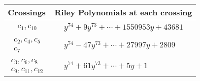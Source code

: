 \documentclass[1p]{elsarticle_modified}
\theoremstyle{definition}
\begin{document}
\begin{tabular}{m{50pt}|m{274pt}}
Crossings & \hspace{64pt}Riley Polynomials at each crossing \\
\hline $$\begin{aligned}c_{1},c_{10}\end{aligned}$$&$\begin{aligned}
&y^{74}+9 y^{73}+\cdots+1550953 y+43681
\end{aligned}$\\
\hline $$\begin{aligned}c_{2},c_{4},c_{5}\\c_{7}\end{aligned}$$&$\begin{aligned}
&y^{74}-47 y^{73}+\cdots+27997 y+2809
\end{aligned}$\\
\hline $$\begin{aligned}c_{3},c_{6},c_{8}\\c_{9},c_{11},c_{12}\end{aligned}$$&$\begin{aligned}
&y^{74}+61 y^{73}+\cdots+5 y+1
\end{aligned}$\\
\hline
\end{tabular}
\vskip 2pc
\end{document}
